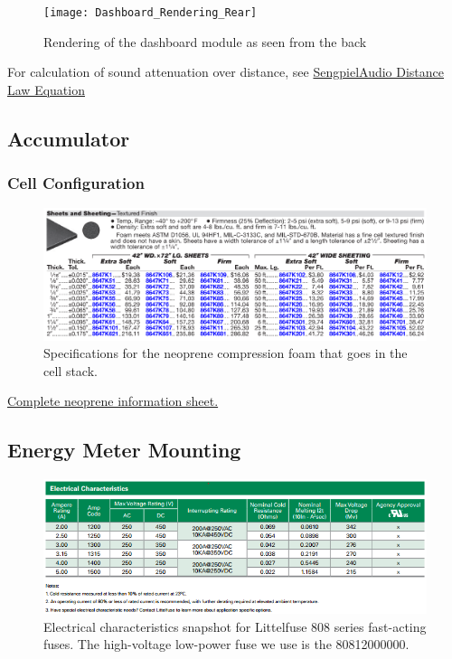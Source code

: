 \documentclass{article}
\begin{document}
\begin{figure}[H]
	\texttt{[image: Dashboard\_Rendering\_Rear]}
	\caption{Rendering of the dashboard module as seen from the back} \label{fig:Dashboard Render}
\end{figure}

For calculation of sound attenuation over distance, see \href{http://www.sengpielaudio.com/calculator-distance.htm}{SengpielAudio Distance Law Equation}

\subsection{Accumulator}\label{appendix_accumulator}

\subsubsection{Cell Configuration}\label{appendix_accumulator_cell_configuration}

\begin{figure} [!ht]
	\centering  %
	\includegraphics[width=\textwidth]{Cell_neoprene_stats.png}
	\caption{Specifications for the neoprene compression foam that goes in the cell stack.}	
	\label{fig:cell_neoprene_stats}
\end{figure}
\href{http://www.kvc.com.my/StorageAttachment/Kvcsb/datasheet/898/mcmaster-8694K154.pdf}{Complete neoprene information sheet.}


\subsection{Energy Meter Mounting}\label{appendix_energy_meter_mounting}

\begin{figure} [!ht]
	\centering  %
	\includegraphics[width=\textwidth]{Littelfuse_808_electrical_characteristics.png}
	\caption{Electrical characteristics snapshot for Littelfuse 808 series fast-acting fuses. The high-voltage low-power fuse we use is the 80812000000.}	
	\label{fig:littelfuse_808}
\end{figure}
\end{document}
